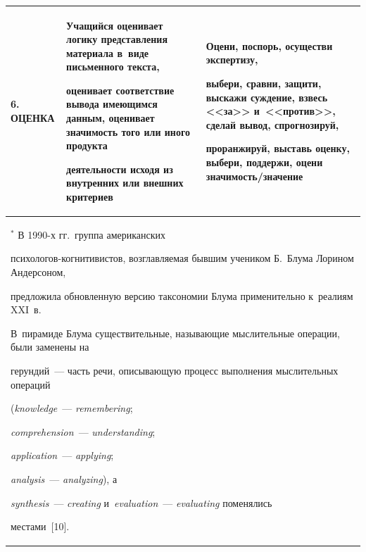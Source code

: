 \begin{table}
\begin{center}
\begin{tabular}{|l|p{60mm}|p{66mm}|}
\\


\hline


6. ОЦЕНКА&Учащийся оценивает логику представления материала в~виде письменного текста,


оценивает соответствие вывода имеющимся данным, оценивает значимость того или иного продукта


деятельности исходя из внутренних или внешних критериев &Оцени, поспорь, осуществи экспертизу,


выбери, сравни, защити, выскажи суждение, взвесь <<за>> и~<<против>>, сделай вывод, спрогнозируй,


проранжируй, выставь оценку, выбери, поддержи, оцени значимость/значение\\


\hline


\multicolumn{3}{p{160mm}}{\footnotesize $^*$ В 1990-х гг.\ группа американских


пси\-хо\-ло\-гов-когни\-ти\-ви\-стов, возглавляемая бывшим учеником Б.~Блума Лорином Андерсоном,


предложила обновленную версию таксономии Блума применительно к~реалиям XXI~в.


В~пирамиде Блума существительные, называющие мыслительные операции, были заменены на


герундий~--- часть речи, описывающую процесс выполнения мыслительных операций


(\textit{knowledge}~--- \textit{remembering};


\textit{comprehension}~--- \textit{understanding};


\textit{application}~---  \textit{applying};


\textit{analysis}~--- \textit{analyzing}), а


\textit{synthesis}~--- \textit{creating} и~\textit{evaluation}~--- \textit{evaluating} поменялись


местами~[10].}


\end{tabular}


\end{center}


\end{table}








